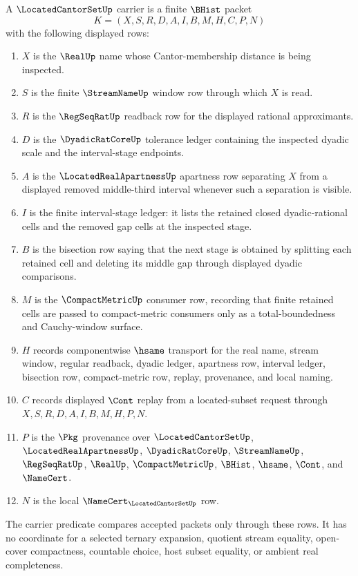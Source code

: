 \begin{definition}
\label{def:located-cantor-set-carrier}
A $\LocatedCantorSetUp$ carrier is a finite $\BHist$ packet
$$
K=(X,S,R,D,A,I,B,M,H,C,P,N)
$$
with the following displayed rows:
\begin{enumerate}
\item $X$ is the $\RealUp$ name whose Cantor-membership distance is being inspected.
\item $S$ is the finite $\StreamNameUp$ window row through which $X$ is read.
\item $R$ is the $\RegSeqRatUp$ readback row for the displayed rational approximants.
\item $D$ is the $\DyadicRatCoreUp$ tolerance ledger containing the inspected dyadic scale and the interval-stage endpoints.
\item $A$ is the $\LocatedRealApartnessUp$ apartness row separating $X$ from a displayed removed middle-third interval whenever such a separation is visible.
\item $I$ is the finite interval-stage ledger: it lists the retained closed dyadic-rational cells and the removed gap cells at the inspected stage.
\item $B$ is the bisection row saying that the next stage is obtained by splitting each retained cell and deleting its middle gap through displayed dyadic comparisons.
\item $M$ is the $\CompactMetricUp$ consumer row, recording that finite retained cells are passed to compact-metric consumers only as a total-boundedness and Cauchy-window surface.
\item $H$ records componentwise $\hsame$ transport for the real name, stream window, regular readback, dyadic ledger, apartness row, interval ledger, bisection row, compact-metric row, replay, provenance, and local naming.
\item $C$ records displayed $\Cont$ replay from a located-subset request through $X,S,R,D,A,I,B,M,H,P,N$.
\item $P$ is the $\Pkg$ provenance over $\LocatedCantorSetUp$, $\LocatedRealApartnessUp$, $\DyadicRatCoreUp$, $\StreamNameUp$, $\RegSeqRatUp$, $\RealUp$, $\CompactMetricUp$, $\BHist$, $\hsame$, $\Cont$, and $\NameCert$.
\item $N$ is the local $\NameCert_{\LocatedCantorSetUp}$ row.
\end{enumerate}
The carrier predicate compares accepted packets only through these rows. It has no coordinate for a selected ternary expansion, quotient stream equality, open-cover compactness, countable choice, host subset equality, or ambient real completeness.
\end{definition}

